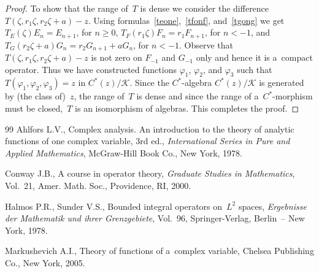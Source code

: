 \documentclass[11pt]{article}
\numberwithin{equation}{section}
\begin{document}
\begin{proof}
To show that the range of~$T$ is dense we consider the dif\/ference $T(\zeta,r_1\zeta, r_2\zeta+a)-z$.
Using formulas~\eqref{teone},~\eqref{tfonf}, and~\eqref{tgong} we get $T_E(\zeta)E_n=E_{n+1}$, for $n\geq 0$,
$T_F(r_1\zeta)F_n=r_1F_{n+1}$, for $n<-1$, and $T_G(r_2\zeta+a)G_n=r_2G_{n+1}+aG_n$, for $n<-1$.
Observe that $T(\zeta,r_1\zeta, r_2\zeta+a)-z$ is not zero on $F_{-1}$ and $G_{-1}$ only and hence it is a~compact operator.
Thus we have constructed functions $\varphi_1$, $\varphi_2$, and $\varphi_3$ such that $T(\varphi_1,\varphi_2,\varphi_3)
= z$ in $C^*(z)/\mathcal{K}$.
Since the $C^*$-algebra $C^*(z)/\mathcal{K}$ is generated by (the class of)~$z$, the range of~$T$ is dense and since the
range of a~$C^*$-morphism must be closed,~$T$ is an isomorphism of algebras.
This completes the proof.
\end{proof}
\begin{thebibliography}{99}
Ahlfors L.V., Complex analysis. An introduction to the theory of analytic
  functions of one complex variable, 3rd ed., \textit{International Series in Pure and
  Applied Mathematics}, McGraw-Hill Book Co., New York, 1978.

Conway J.B., A course in operator theory, \textit{Graduate Studies in
  Mathematics}, Vol.~21, Amer. Math. Soc., Providence, RI, 2000.

Halmos P.R., Sunder V.S., Bounded integral operators on~{$L^{2}$} spaces,
  \textit{Ergebnisse der Mathematik und ihrer Grenzgebiete}, Vol.~96,
  Springer-Verlag, Berlin~-- New York, 1978.

Markushevich A.I., Theory of functions of a~complex variable, Chelsea
  Publishing Co., New York, 2005.

\end{thebibliography}
\end{document}

